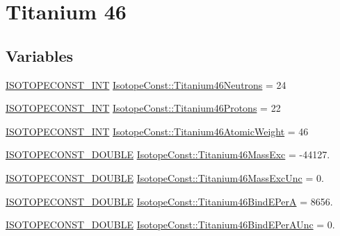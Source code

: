 \hypertarget{group___isotope_const-_titanium-_ti46}{}\section{Titanium 46}
\label{group___isotope_const-_titanium-_ti46}
\subsection*{Variables}
\begin{DoxyCompactItemize}
\item 
\mbox{\hyperlink{group___isotope_const-_macros_ga5f18360b3e99483a35c32d789e62621c}{I\+S\+O\+T\+O\+P\+E\+C\+O\+N\+S\+T\+\_\+\+I\+NT}} \mbox{\hyperlink{group___isotope_const-_titanium-_ti46_ga43cbefdca1c07fc543f20c914979cb47}{Isotope\+Const\+::\+Titanium46\+Neutrons}} = 24
\item 
\mbox{\hyperlink{group___isotope_const-_macros_ga5f18360b3e99483a35c32d789e62621c}{I\+S\+O\+T\+O\+P\+E\+C\+O\+N\+S\+T\+\_\+\+I\+NT}} \mbox{\hyperlink{group___isotope_const-_titanium-_ti46_gac0704505afbf387cf3bc5cd6591d80b3}{Isotope\+Const\+::\+Titanium46\+Protons}} = 22
\item 
\mbox{\hyperlink{group___isotope_const-_macros_ga5f18360b3e99483a35c32d789e62621c}{I\+S\+O\+T\+O\+P\+E\+C\+O\+N\+S\+T\+\_\+\+I\+NT}} \mbox{\hyperlink{group___isotope_const-_titanium-_ti46_gaaa496a67b4bf9f74beb6ccbb35dfbddb}{Isotope\+Const\+::\+Titanium46\+Atomic\+Weight}} = 46
\item 
\mbox{\hyperlink{group___isotope_const-_macros_ga8f45a7272ce02c0b4c65c44636ed719a}{I\+S\+O\+T\+O\+P\+E\+C\+O\+N\+S\+T\+\_\+\+D\+O\+U\+B\+LE}} \mbox{\hyperlink{group___isotope_const-_titanium-_ti46_gac106d432216c4b4fed4c3141342a37c0}{Isotope\+Const\+::\+Titanium46\+Mass\+Exc}} = -\/44127.
\item 
\mbox{\hyperlink{group___isotope_const-_macros_ga8f45a7272ce02c0b4c65c44636ed719a}{I\+S\+O\+T\+O\+P\+E\+C\+O\+N\+S\+T\+\_\+\+D\+O\+U\+B\+LE}} \mbox{\hyperlink{group___isotope_const-_titanium-_ti46_ga79771c8c55d5c149020832e55124522f}{Isotope\+Const\+::\+Titanium46\+Mass\+Exc\+Unc}} = 0.
\item 
\mbox{\hyperlink{group___isotope_const-_macros_ga8f45a7272ce02c0b4c65c44636ed719a}{I\+S\+O\+T\+O\+P\+E\+C\+O\+N\+S\+T\+\_\+\+D\+O\+U\+B\+LE}} \mbox{\hyperlink{group___isotope_const-_titanium-_ti46_ga1df6cd7cee3509c0ccb7a6345dfb6c43}{Isotope\+Const\+::\+Titanium46\+Bind\+E\+PerA}} = 8656.
\item 
\mbox{\hyperlink{group___isotope_const-_macros_ga8f45a7272ce02c0b4c65c44636ed719a}{I\+S\+O\+T\+O\+P\+E\+C\+O\+N\+S\+T\+\_\+\+D\+O\+U\+B\+LE}} \mbox{\hyperlink{group___isotope_const-_titanium-_ti46_gabc01647323a98b2fef21d57ea203fd58}{Isotope\+Const\+::\+Titanium46\+Bind\+E\+Per\+A\+Unc}} = 0.

\end{DoxyCompactItemize}

